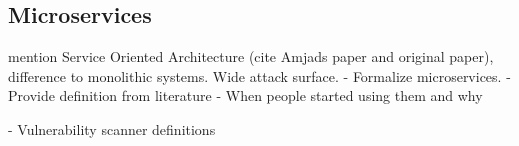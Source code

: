 \subsection{Microservices}
\label{chap:microservices}
mention Service Oriented Architecture \cite{ahmadvand2016requirements} \cite{papazoglou2003service} (cite Amjads paper and original paper), difference to monolithic systems. Wide attack surface.
- Formalize microservices. 
- Provide definition from literature
- When people started using them and why

- Vulnerability scanner definitions